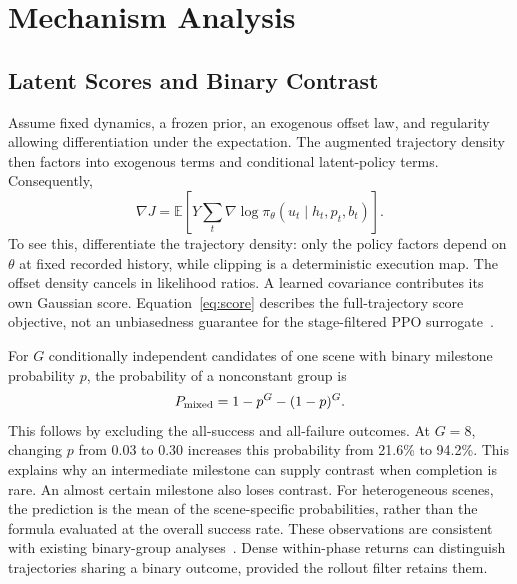 \section{Mechanism Analysis}\label{sec:theory}
\subsection{Latent Scores and Binary Contrast}
Assume fixed dynamics, a frozen prior, an exogenous offset law, and regularity allowing differentiation under the expectation. The augmented trajectory density then factors into exogenous terms and conditional latent-policy terms. Consequently,
\begin{equation}
\nabla J=\mathbb E\!\left[Y\sum_t\nabla\log\pi_\theta(u_t\mid h_t,p_t,b_t)\right].
\label{eq:score}
\end{equation}
To see this, differentiate the trajectory density: only the policy factors depend on $\theta$ at fixed recorded history, while clipping is a deterministic execution map. The offset density cancels in likelihood ratios. A learned covariance contributes its own Gaussian score. Equation~\eqref{eq:score} describes the full-trajectory score objective, not an unbiasedness guarantee for the stage-filtered PPO surrogate~\cite{capg}.

For $G$ conditionally independent candidates of one scene with binary milestone probability $p$, the probability of a nonconstant group is
\begin{equation}
P_{\rm mixed}=1-p^G-(1-p)^G.
\label{eq:mixed}
\end{equation}
This follows by excluding the all-success and all-failure outcomes. At $G=8$, changing $p$ from 0.03 to 0.30 increases this probability from 21.6\% to 94.2\%. This explains why an intermediate milestone can supply contrast when completion is rare. An almost certain milestone also loses contrast. For heterogeneous scenes, the prediction is the mean of the scene-specific probabilities, rather than the formula evaluated at the overall success rate. These observations are consistent with existing binary-group analyses~\cite{mroueh2026,bay2026}. Dense within-phase returns can distinguish trajectories sharing a binary outcome, provided the rollout filter retains them.

